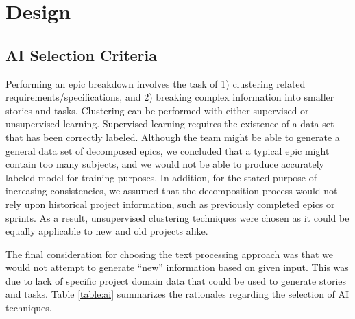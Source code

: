\section{Design}
\label{design}

\subsection{AI Selection Criteria}
\label{subsection:criteria}
Performing an epic breakdown involves the task of 1) clustering related requirements/specifications, and 2) breaking complex information into smaller stories and tasks. Clustering can be performed with either supervised or unsupervised learning. Supervised learning requires the existence of a data set that has been correctly labeled. Although the team might be able to generate a general data set of decomposed epics, we concluded that a typical epic might contain too many subjects, and we would not be able to produce accurately labeled model for training purposes. 
In addition, for the stated purpose of increasing consistencies, we assumed that the decomposition process would not rely upon historical project information, such as previously completed epics or sprints. As a result, unsupervised clustering techniques were chosen as it could be equally applicable to new and old projects alike.

The final consideration for choosing the text processing approach was that we would not attempt to generate ``new'' information based on given input. This was due to  lack of  specific project domain data that could be used to generate stories and tasks. Table \ref{table:ai} summarizes the rationales regarding the selection of AI techniques.

